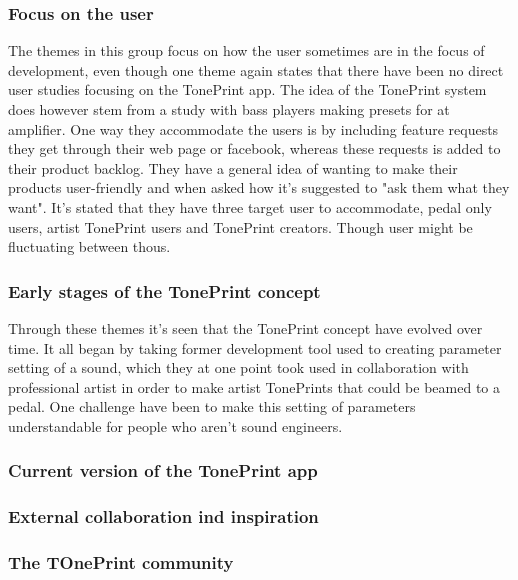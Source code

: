 \subsubsection*{Focus on the user}
The themes in this group focus on how the user sometimes are in the focus of development, even though one theme again states that there have been no direct user studies focusing on the TonePrint app. The idea of the TonePrint system does however stem from a study with bass players making presets for at amplifier. One way they accommodate the users is by including feature requests they get through their web page or facebook, whereas these requests is added to their product backlog. They have a general idea of wanting to make their products user-friendly and when asked how it's suggested to "ask them what they want". It's stated that they have three target user to accommodate, pedal only users, artist TonePrint users and TonePrint creators. Though user might be fluctuating between thous.

\subsubsection*{Early stages of the TonePrint concept}
Through these themes it's seen that the TonePrint concept have evolved over time. It all began by taking former development tool used to creating parameter setting of a sound, which they at one point took used in collaboration with professional artist in order to make artist TonePrints that could be beamed to a pedal. One challenge have been to make this setting of parameters understandable for people who aren't sound engineers.

\subsubsection*{Current version of the TonePrint app}


\subsubsection*{External collaboration ind inspiration}


\subsubsection*{The TOnePrint community}



